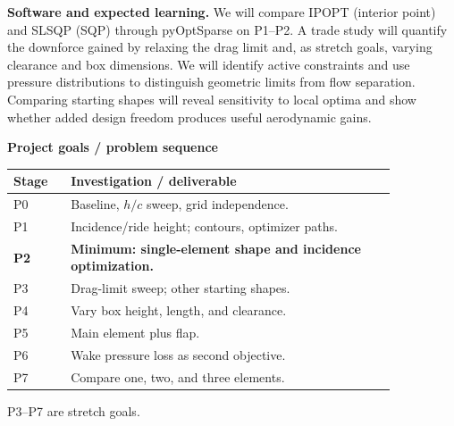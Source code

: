 \documentclass[11pt,letterpaper]{article}
\begin{document}
\textbf{Software and expected learning.}
We will compare IPOPT (interior point) and SLSQP (SQP) through pyOptSparse on P1--P2. A trade study will quantify the downforce gained by relaxing the drag limit and, as stretch goals, varying clearance and box dimensions. We will identify active constraints and use pressure distributions to distinguish geometric limits from flow separation. Comparing starting shapes will reveal sensitivity to local optima and show whether added design freedom produces useful aerodynamic gains.

\vspace{4pt}
\noindent
\begin{minipage}[t]{0.55\linewidth}
\vspace{0pt}
\textbf{Project goals / problem sequence}
\par\vspace{4pt}
\setlength{\tabcolsep}{3pt}
\renewcommand{\arraystretch}{1.02}
\begin{tabular}{@{}l p{0.85\linewidth}@{}}
\hline
Stage & Investigation / deliverable \\
\hline
P0 & Baseline, $h/c$ sweep, grid independence. \\
P1 & Incidence/ride height; contours, optimizer paths. \\
\textbf{P2} & \textbf{Minimum: single-element shape and incidence optimization.} \\
P3 & Drag-limit sweep; other starting shapes. \\
P4 & Vary box height, length, and clearance. \\
P5 & Main element plus flap. \\
P6 & Wake pressure loss as second objective. \\
P7 & Compare one, two, and three elements. \\
\hline
\end{tabular}
\par\vspace{4pt}
P3--P7 are stretch goals.
\end{minipage}\hfill
\end{document}
